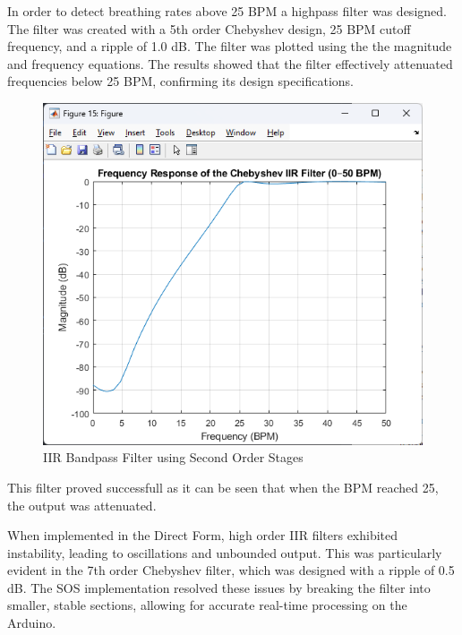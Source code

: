 \documentclass[journal]{IEEEtran}
\begin{document}
In order to detect breathing rates above 25 BPM a highpass filter was designed. The filter was created with a 5th order Chebyshev design, 25 BPM cutoff frequency, and a ripple of 1.0 dB. The filter was plotted using the the magnitude and frequency equations. The results showed that the filter effectively attenuated frequencies below 25 BPM, confirming its design specifications.

\begin{figure}[H]
    \centering
    \includegraphics[width=\linewidth]{5thOrderChebyHighpassFrequency.png}
    \caption{IIR Bandpass Filter using Second Order Stages}
    \label{fig:cheby_high_freq}
\end{figure}

This filter proved successfull as it can be seen that when the BPM reached 25, the output was attenuated.

When implemented in the Direct Form, high order IIR filters exhibited instability, leading to oscillations and unbounded output. This was particularly evident in the 7th order Chebyshev filter, which was designed with a ripple of 0.5 dB. The SOS implementation resolved these issues by breaking the filter into smaller, stable sections, allowing for accurate real-time processing on the Arduino.
\end{document}
